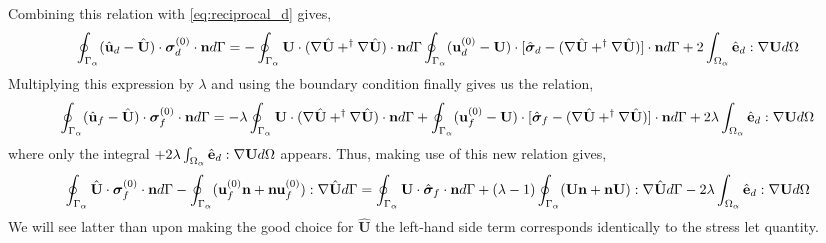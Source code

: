 Combining this relation with \ref{eq:reciprocal_d} gives,
\begin{equation}
    \oint_{\Gamma_{\alpha}} (\hat{\textbf{u}}_d - \hat{\textbf{U}})\cdot \bm\sigma_d^{(0)} \cdot \textbf{n} d\Gamma
    =
    - \oint_{\Gamma_{\alpha}}   \textbf{U} \cdot (\mathbf{\nabla} \hat{\textbf{U}} + ^\dagger\mathbf{\nabla} \hat{\textbf{U}})  \cdot \textbf{n} d\Gamma
    \oint_{\Gamma_{\alpha}} (\textbf{u}_d^{(0)} - \textbf{U}) \cdot  [\hat{\bm\sigma}_d -(\mathbf{\nabla} \hat{\textbf{U}} + ^\dagger\mathbf{\nabla} \hat{\textbf{U}})]\cdot \textbf{n}  d\Gamma
    + 2\int_{\Omega_{\alpha}} \hat{\textbf{e}}_d : \mathbf{\nabla} \textbf{U} d\Omega 
\end{equation}
Multiplying this expression by $\lambda$ and using the boundary condition finally gives us the relation,
\begin{equation}
    \oint_{\Gamma_{\alpha}} (\hat{\textbf{u}}_f - \hat{\textbf{U}})\cdot \bm\sigma_f^{(0)} \cdot \textbf{n} d\Gamma
    =
    - \lambda\oint_{\Gamma_{\alpha}}   \textbf{U} \cdot (\mathbf{\nabla} \hat{\textbf{U}} + ^\dagger\mathbf{\nabla} \hat{\textbf{U}})  \cdot \textbf{n} d\Gamma
    + \oint_{\Gamma_{\alpha}} (\textbf{u}_f^{(0)} - \textbf{U}) \cdot  [\hat{\bm\sigma}_f -(\mathbf{\nabla} \hat{\textbf{U}} + ^\dagger\mathbf{\nabla} \hat{\textbf{U}})]\cdot \textbf{n}  d\Gamma
    + 2\lambda\int_{\Omega_{\alpha}} \hat{\textbf{e}}_d : \mathbf{\nabla} \textbf{U} d\Omega 
\end{equation}
where only the integral $+ 2\lambda\int_{\Omega_{\alpha}} \hat{\textbf{e}}_d : \mathbf{\nabla} \textbf{U} d\Omega $ appears. 
Thus, making use of this new relation gives, 
\begin{equation}
    \oint_{\Gamma_{\alpha}} \hat{\textbf{U}}\cdot  \bm\sigma_f^{(0)} \cdot \textbf{n} d\Gamma
    - \oint_{\Gamma_{\alpha}} (\textbf{u}_f^{(0)}\textbf{n}+\textbf{nu}_f^{(0)})  : \mathbf{\nabla} \hat{\textbf{U}}  d\Gamma
    = 
    \oint_{\Gamma_{\alpha}} \textbf{U}\cdot  \hat{\bm\sigma}_f \cdot \textbf{n} d\Gamma
    +(\lambda -1) \oint_{\Gamma_{\alpha}}   (\textbf{U} \textbf{n}+ \textbf{n} \textbf{U}) : \mathbf{\nabla} \hat{\textbf{U}}   d\Gamma
    - 2\lambda\int_{\Omega_{\alpha}} \hat{\textbf{e}}_d : \mathbf{\nabla} \textbf{U} d\Omega
    \label{eq:reciprocal_f2}
\end{equation}
We will see latter than upon making the good choice for $\hat{\textbf{U}}$ the left-hand side term corresponds identically to the stress let quantity. 



